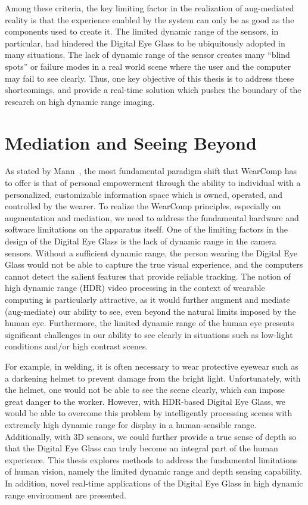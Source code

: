 Among these criteria, the key limiting factor in the realization of aug-mediated reality is that the 
experience enabled by the system can only be as good as the components used to create it. The 
limited dynamic range of the sensors, in particular, had hindered the Digital Eye Glass to be 
ubiquitously adopted in many situations. The lack of dynamic range of the sensor creates many ``blind 
spots'' or failure modes in a real world scene where the user and the computer may fail to see clearly. 
Thus, one key objective of this thesis is to address these shortcomings, and provide a real-time 
solution which pushes the boundary of the research on high dynamic range imaging.


\section{Mediation and Seeing Beyond}
As stated by Mann~\cite{mann2001wearable}, the most fundamental paradigm shift that WearComp 
has to offer is that of personal empowerment through the ability to individual with a personalized, 
customizable information space which is owned, operated, and controlled by the wearer. To realize 
the WearComp principles, especially on augmentation and mediation, we need to address the 
fundamental hardware and software limitations on the apparatus itself. One of the limiting factors in 
the design of the Digital Eye Glass is the lack of dynamic range in the camera sensors. Without a 
sufficient dynamic range, the person wearing the Digital Eye Glass would not be able to capture the 
true visual experience, and the computers cannot detect the salient features that provide reliable 
tracking. The notion of high dynamic range (HDR) video processing in the context of wearable 
computing is particularly attractive, as it would further augment and mediate (aug-mediate) our ability 
to see, even beyond the natural limits imposed by the human eye.  Furthermore, the limited dynamic 
range of the human eye presents significant challenges in our ability to see clearly in situations such 
as low-light conditions and/or high contrast scenes. 

For example, in welding, it is often necessary to wear protective eyewear such as a darkening helmet 
to prevent damage from the bright light. Unfortunately, with the helmet, one would not be able to see 
the scene clearly, which can impose great danger to the worker.  However, with HDR-based Digital 
Eye Glass, we would be able to overcome this problem by intelligently processing scenes with 
extremely high dynamic range for display in a human-sensible range.  Additionally, with 3D sensors, 
we could further provide a true sense of depth so that the Digital Eye Glass can truly become an 
integral part of the human experience.  This thesis explores methods to address the fundamental 
limitations of human vision, namely the limited dynamic range and depth sensing capability. In 
addition, novel real-time applications of the Digital Eye Glass in high dynamic range environment are 
presented.

